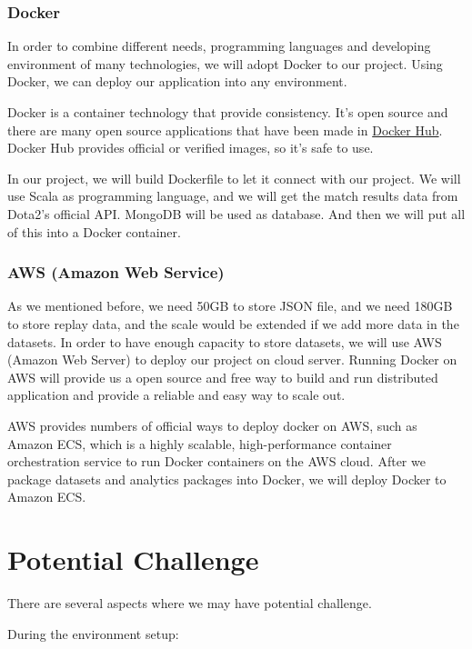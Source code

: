 \documentclass{article}
\begin{document}
\subsubsection{Docker}

In order to combine different needs, programming languages and developing environment of many technologies, we will adopt Docker to our project.
Using Docker, we can deploy our application into any environment.

Docker is a container technology that provide consistency.
It's open source and there are many open source applications that have been made in \href{https://hub.docker.com}{Docker Hub}.
Docker Hub provides official or verified images, so it's safe to use.

In our project, we will build Dockerfile to let it connect with our project.
We will use Scala as programming language, and we will get the match results data from Dota2's official API.
MongoDB will be used as database. And then we will put all of this into a Docker container.

\subsubsection{AWS (Amazon Web Service)}

As we mentioned before, we need 50GB to store JSON file, and we need 180GB to store replay data, and the scale would be extended if we add more data in the datasets.
In order to have enough capacity to store datasets, we will use AWS (Amazon Web Server) to deploy our project on cloud server.
Running Docker on AWS will provide us a open source and free way to build and run distributed application and provide a reliable and easy way to scale out.

AWS provides numbers of official ways to deploy docker on AWS, such as Amazon ECS, which is a highly scalable, high-performance container orchestration service to run Docker containers on the AWS cloud.
After we package datasets and analytics packages into Docker, we will deploy Docker to Amazon ECS.


\section{Potential Challenge}

There are several aspects where we may have potential challenge.

During the environment setup:
\end{document}
